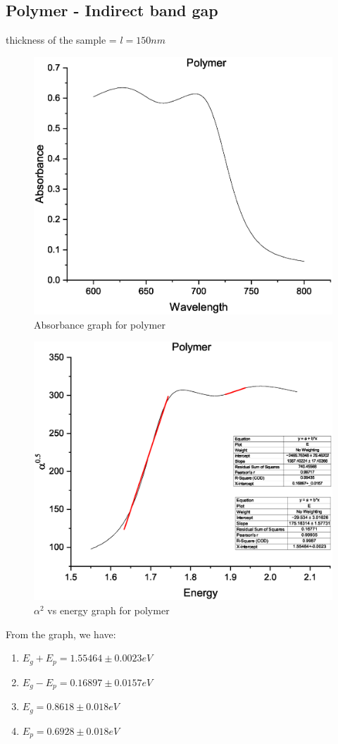 	\subsection{Polymer - Indirect band gap}
		thickness of the sample = $l = 150nm$
		\begin{figure}[h]
			\centering
			\includegraphics[width=0.8\columnwidth]{images/pola.eps}
			\caption{Absorbance graph for polymer}
			\label{graph:5}
		\end{figure}
		\begin{figure}[h]
			\centering
			\includegraphics[width=0.8\columnwidth]{images/poly.eps}
			\caption{$\alpha^2$ vs energy graph for polymer}
			\label{graph:6}
		\end{figure}

		From the graph, we have:
		\begin{enumerate}
			\item $E_g + E_p = 1.55464\pm0.0023eV$
			\item $E_g - E_p = 0.16897\pm0.0157eV$
			\item $E_g = 0.8618\pm0.018eV$
			\item $E_p = 0.6928\pm0.018eV$
		\end{enumerate}


